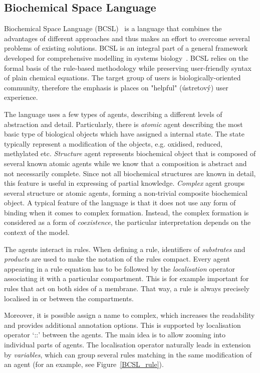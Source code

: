 \documentclass[11pt,a4paper]{report}
\begin{document}
\subsection{Biochemical Space Language}

Biochemical Space Language (BCSL)~\cite{trojak2018sasb} is a language that combines the advantages of different approaches and thus makes an effort to overcome several problems of existing solutions. BCSL is an integral part of a general framework developed for comprehensive modelling in systems biology~\cite{cs2bio2013,BCS}. BCSL relies on the formal basis of the rule-based methodology while preserving user-friendly syntax of plain chemical equations. The target group of users is biologically-oriented community, therefore the emphasis is places on "helpful" (ústretový) user experience.

The language uses a few types of agents, describing a different levels of abstraction and detail. Particularly, there is \emph{atomic} agent describing the most basic type of biological objects which have assigned a internal state. The state typically represent a modification of the objects, e.g. oxidised, reduced, methylated etc. \emph{Structure} agent represents biochemical object that is composed of several known atomic agents while we know that a composition is abstract and not necessarily complete. Since not all biochemical structures are known in detail, this feature is useful in expressing of partial knowledge. \emph{Complex} agent groups several structure or atomic agents, forming a non-trivial composite biochemical object. A typical feature of the language is that it does not use any form of binding when it comes to complex formation. Instead, the complex formation is considered as a form of \emph{coexistence}, the particular interpretation depends on the context of the model. 

The agents interact in rules. When defining a rule, identifiers of \emph{substrates} and \emph{products} are used to make the notation of the rules compact. Every agent appearing in a rule equation has to be followed by the \emph{localisation} operator associating it with a particular compartment. This is for example important for rules that act on both sides of a membrane. That way, a rule is always precisely localised in or between the compartments.

Moreover, it is possible assign a name to complex, which increases the readability and provides additional annotation options. This is supported by localisation operator `{::}' between the agents. The main idea is to allow zooming into individual parts of agents. The localisation operator naturally leads in extension by \emph{variables}, which can group several rules matching in the same modification of an agent (for an example, see Figure~\ref{BCSL_rule}).
\end{document}
